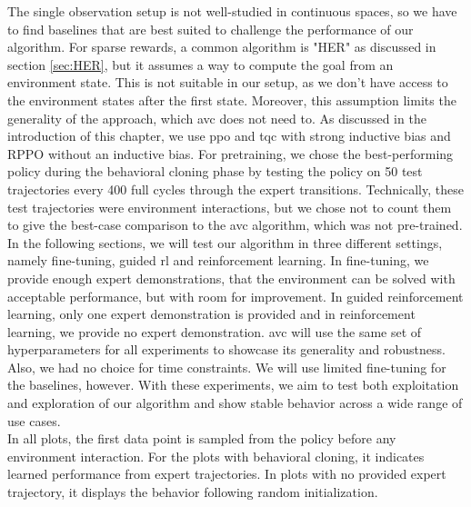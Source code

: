 The single observation setup is not well-studied in continuous spaces, so we have to find baselines that are best suited to challenge the performance of our algorithm. For sparse rewards, a common
algorithm is "HER" as discussed in section \ref{sec:HER}, but it assumes a way to compute the goal from an environment state. This is not suitable in our setup, as we don't have access to the environment
states after the first state. Moreover, this assumption limits the generality of the approach, which \ac{avc} does not need to.
As discussed in the introduction of this chapter, we use \ac{ppo} and \ac{tqc} with strong inductive bias and RPPO without an inductive bias. 
For pretraining, we chose the best-performing policy during the behavioral cloning phase by testing the policy on 50 test 
trajectories every 400 full cycles through the 
expert transitions. Technically, these test trajectories were environment interactions, but we chose not to count them to give the best-case comparison to the \ac{avc} algorithm, which was not pre-trained.\\

In the following sections, we will test our algorithm in three different settings, namely fine-tuning, guided \ac{rl} and reinforcement learning. In fine-tuning, we provide
enough expert demonstrations, that the environment can be solved with acceptable performance, but with room for improvement. In guided reinforcement learning,
only one expert demonstration is provided and in reinforcement learning, we provide no expert demonstration. \ac{avc} will use the same set of hyperparameters for all experiments to showcase its generality and robustness. Also, we had no choice for time constraints.
We will use limited fine-tuning for the baselines, however.
With these experiments, we aim to test both exploitation and exploration of our algorithm and show stable
behavior across a wide range of use cases. \\

In all plots, the first data point is sampled from the policy before any environment interaction. For the plots with behavioral cloning, it indicates learned performance from expert trajectories.
In plots with no provided expert trajectory, it displays the behavior following random initialization.

